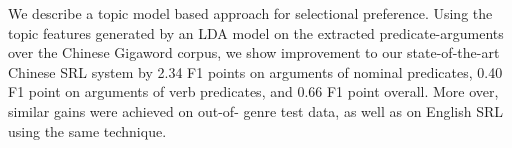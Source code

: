 We describe a topic model based approach for selectional preference. Using the topic features generated by an LDA model on the extracted predicate-arguments over the Chinese Gigaword corpus, we show improvement to our state-of-the-art Chinese SRL system by 2.34 F1 points on arguments of nominal predicates, 0.40 F1 point on arguments of verb predicates, and 0.66 F1 point overall. More over, similar gains were achieved on out-of- genre test data, as well as on English SRL using the same technique.
